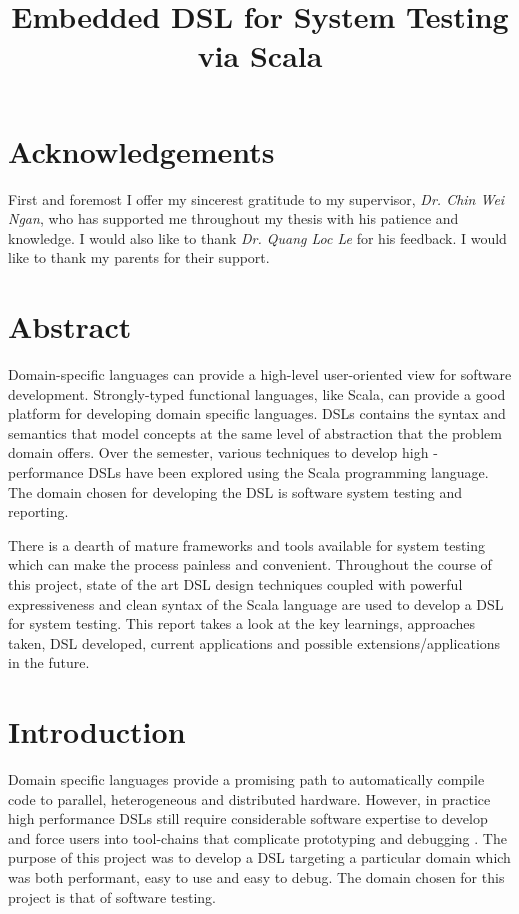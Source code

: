 \documentclass[12pt]{article}
\begin{document}
\title{Embedded DSL for System Testing via Scala}

\maketitle
\onehalfspacing
\vspace{-10 mm}
\tableofcontents
\newpage

\newpage
\section{Acknowledgements}
First and foremost I offer my sincerest gratitude to my supervisor, \textit{Dr. Chin Wei Ngan}, who has supported me throughout my thesis with his patience and knowledge. I would also like to thank \textit{Dr. Quang Loc Le} for his feedback. I would like to thank my parents for their support.

\newpage

\section{Abstract}
Domain-specific languages can provide a high-level user-oriented view for software development. Strongly-typed functional languages, like Scala, can provide a good platform for developing domain specific languages. DSLs contains the syntax and semantics that model concepts at the same level of abstraction that the problem domain offers. Over the semester, various techniques to develop high - performance DSLs have been explored using the Scala programming language. The domain chosen for developing the DSL is software system testing and reporting.
\bigskip

\noindent
There is a dearth of mature frameworks and tools available for system testing which can make the process painless and convenient. Throughout the course of this project, state of the art DSL design techniques coupled with powerful expressiveness and clean syntax of the Scala language are used to develop a DSL for system testing. This report takes a look at the key learnings, approaches taken, DSL developed, current applications and possible extensions/applications in the future.
\newpage

\section{Introduction}

\noindent
Domain specific languages provide a promising path to automatically compile code to parallel, heterogeneous and distributed hardware. However, in practice high performance DSLs still require considerable software expertise to develop and force users into tool-chains that complicate  prototyping and debugging \cite{delite}. The purpose of this project was to develop a DSL targeting a particular domain which was both performant, easy to use and easy to debug. The domain chosen for this project is that of software testing.
\end{document}
